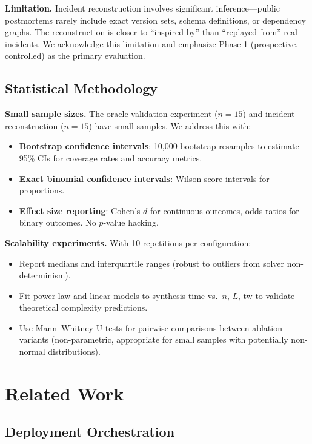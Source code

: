 \documentclass[10pt,twocolumn]{article}
\begin{document}
\textbf{Limitation.} Incident reconstruction involves significant inference---public postmortems rarely include exact version sets, schema definitions, or dependency graphs. The reconstruction is closer to ``inspired by'' than ``replayed from'' real incidents. We acknowledge this limitation and emphasize Phase 1 (prospective, controlled) as the primary evaluation.

\subsection{Statistical Methodology}
\label{sec:stats}

\textbf{Small sample sizes.} The oracle validation experiment ($n=15$) and incident reconstruction ($n=15$) have small samples. We address this with:
\begin{itemize}
\item \textbf{Bootstrap confidence intervals}: 10,000 bootstrap resamples to estimate 95\% CIs for coverage rates and accuracy metrics.
\item \textbf{Exact binomial confidence intervals}: Wilson score intervals for proportions.
\item \textbf{Effect size reporting}: Cohen's $d$ for continuous outcomes, odds ratios for binary outcomes. No $p$-value hacking.
\end{itemize}

\textbf{Scalability experiments.} With 10 repetitions per configuration:
\begin{itemize}
\item Report medians and interquartile ranges (robust to outliers from solver non-determinism).
\item Fit power-law and linear models to synthesis time vs.\ $n$, $L$, tw to validate theoretical complexity predictions.
\item Use Mann--Whitney U tests for pairwise comparisons between ablation variants (non-parametric, appropriate for small samples with potentially non-normal distributions).
\end{itemize}

\section{Related Work}
\label{sec:related}

\subsection{Deployment Orchestration}
\label{sec:related-deploy}
\end{document}
